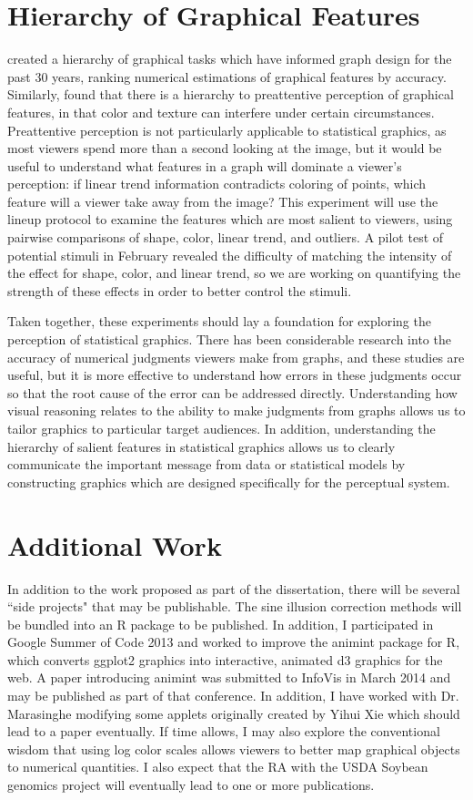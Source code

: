 \documentclass[11pt]{isuthesis}\usepackage[]{graphicx}\usepackage[]{color}
\begin{document}
\section{Hierarchy of Graphical Features}
\citet{cleveland:1984} created a hierarchy of graphical tasks which have informed graph design for the past 30 years, ranking numerical estimations of graphical features by accuracy. Similarly, \citet{healey1999large} found that there is a hierarchy to preattentive perception of graphical features, in that color and texture can interfere under certain circumstances. Preattentive perception is not particularly applicable to statistical graphics, as most viewers spend more than a second looking at the image, but it would be useful to understand what features in a graph will dominate a viewer's perception: if linear trend information contradicts coloring of points, which feature will a viewer take away from the image? This experiment will use the lineup protocol to examine the features which are most salient to viewers, using pairwise comparisons of shape, color, linear trend, and outliers. A pilot test of potential stimuli in February revealed the difficulty of matching the intensity of the effect for shape, color, and linear trend, so we are working on quantifying the strength of these effects in order to better control the stimuli.

Taken together, these experiments should lay a foundation for exploring the perception of statistical graphics. There has been considerable research into the accuracy of numerical judgments viewers make from graphs, and these studies are useful, but it is more effective to understand how errors in these judgments occur so that the root cause of the error can be addressed directly. Understanding how visual reasoning relates to the ability to make judgments from graphs allows us to tailor graphics to particular target audiences. In addition, understanding the hierarchy of salient features in statistical graphics allows us to clearly communicate the important message from data or statistical models by constructing graphics which are designed specifically for the perceptual system. 

\section{Additional Work} 
In addition to the work proposed as part of the dissertation, there will be several ``side projects" that may be publishable. The sine illusion correction methods will be bundled into an R package to be published. In addition, I participated in Google Summer of Code 2013 and worked to improve the animint package for R, which converts ggplot2 graphics into interactive, animated d3 graphics for the web. A paper introducing animint was submitted to InfoVis in March 2014 and may be published as part of that conference. In addition, I have worked with Dr. Marasinghe modifying some applets originally created by Yihui Xie which should lead to a paper eventually. If time allows, I may also explore the conventional wisdom that using log color scales allows viewers to better map graphical objects to numerical quantities. I also expect that the RA with the USDA Soybean genomics project will eventually lead to one or more publications. 
\end{document}

